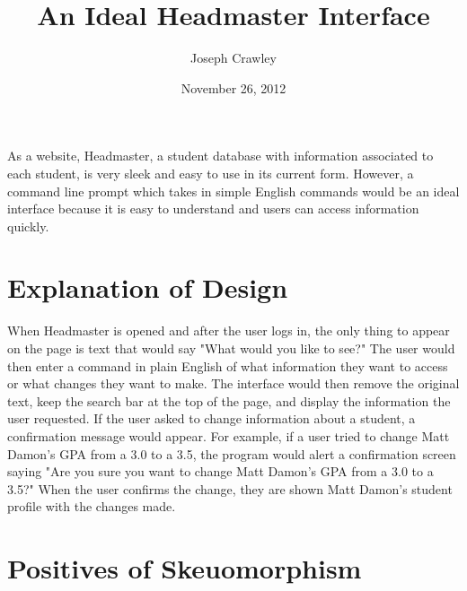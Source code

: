 \documentclass{article}
\title{An Ideal Headmaster Interface}
\author{Joseph Crawley}
\date{November 26, 2012}
\begin{document}
\maketitle

\abstract{}
As a website, Headmaster, a student database with information associated to each student, is very sleek and easy to use in its current form. However, a command line prompt which takes in simple English commands would be an ideal interface because it is easy to understand and users can access information quickly.

\pagebreak
\tableofcontents





\pagebreak

%
%
\section{Explanation of Design}
\label{introduction}

When Headmaster is opened and after the user logs in, the only thing to appear on the page is text that would say "What would you like to see?" The user would then enter a command in plain English of what information they want to access or what changes they want to make. The interface would then remove the original text, keep the search bar at the top of the page, and display the information the user requested. If the user asked to change information about a student, a confirmation message would appear. For example, if a user tried to change Matt Damon's GPA from a 3.0 to a 3.5, the program would alert a confirmation screen saying "Are you sure you want to change Matt Damon's GPA from a 3.0 to a 3.5?" When the user confirms the change, they are shown Matt Damon's student profile with the changes made.

\section{Positives of Skeuomorphism}
\end{document}
